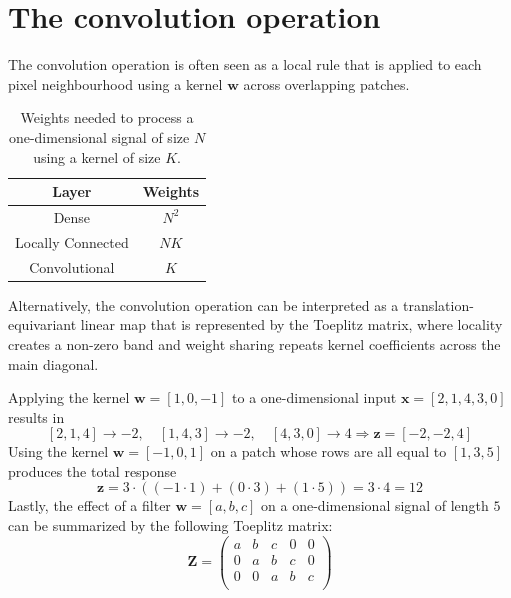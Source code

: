 \documentclass{report}
\begin{document}
\section{The convolution operation}
The convolution operation is often seen as a local rule that is applied to each pixel neighbourhood using a kernel $\displaystyle \mathbf{w}$ across overlapping patches.
\begin{table}[H]
    \centering
    \begin{tabular}{|c|c|}
    \hline
    \textbf{Layer} & \textbf{Weights} \\
    \hline
    Dense & $\displaystyle N^2$ \\
    \hline
    Locally Connected & $\displaystyle NK$ \\
    \hline
    Convolutional & $\displaystyle K$ \\
    \hline
    \end{tabular}
    \caption{Weights needed to process a one-dimensional signal of size $\displaystyle N$ using a kernel of size $\displaystyle K$.}
    \label{tab:convolution_weights}
\end{table}
\noindent Alternatively, the convolution operation can be interpreted as a translation-equivariant linear map that is represented by the Toeplitz matrix, where locality creates a non-zero band and weight sharing repeats kernel coefficients across the main diagonal.
\begin{examplebox}
    Applying the kernel $\displaystyle \mathbf{w} = [1, 0, -1]$ to a one-dimensional input $\displaystyle \mathbf{x} = [2, 1, 4, 3, 0]$ results in
    \[[2, 1, 4] \to -2, \quad [1, 4, 3] \to -2, \quad [4, 3, 0] \to 4 \Rightarrow \mathbf{z} = [-2, -2, 4]\]
    Using the kernel $\displaystyle \mathbf{w} = [-1, 0, 1]$ on a patch whose rows are all equal to $\displaystyle [1, 3, 5]$ produces the total response
    \[\mathbf{z} =  3 \cdot ((-1 \cdot 1) + (0 \cdot 3) + (1 \cdot 5)) = 3 \cdot 4 = 12\]
    Lastly, the effect of a filter $\displaystyle \mathbf{w} = [a, b, c]$ on a one-dimensional signal of length $\displaystyle 5$ can be summarized by the following Toeplitz matrix:
    \[\mathbf{Z} = \begin{pmatrix}
        a & b & c & 0 & 0 \\
        0 & a & b & c & 0 \\
        0 & 0 & a & b & c \\
    \end{pmatrix}\]
\end{examplebox}
\end{document}
